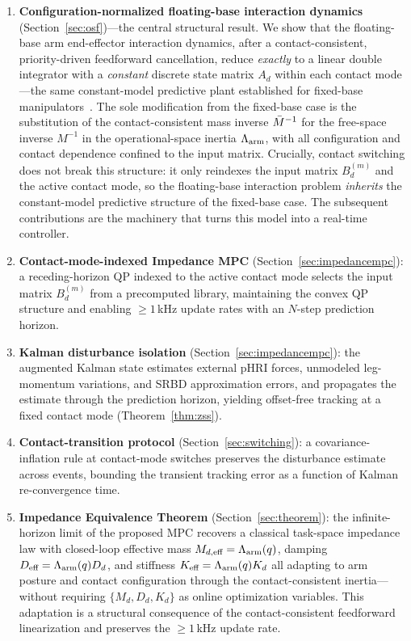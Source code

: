 \begin{enumerate}
\item \textbf{Configuration-normalized floating-base interaction dynamics}
(Section~\ref{sec:osf})---the central structural result. We show that the
floating-base arm end-effector interaction dynamics, after a
contact-consistent, priority-driven feedforward cancellation, reduce
\emph{exactly} to a linear double integrator with a \emph{constant} discrete
state matrix $A_d$ within each contact mode---the same constant-model
predictive plant established for fixed-base manipulators~\cite{cao2026impedance}.
The sole modification from the fixed-base case is the substitution of the
contact-consistent mass inverse $\bar{M}^{-1}$ for the free-space inverse $M^{-1}$
in the operational-space inertia $\Lambda_{\text{arm}}$, with all configuration and contact
dependence confined to the input matrix. Crucially, contact switching does
not break this structure: it only reindexes the input matrix $B_d^{(m)}$ and
the active contact mode, so the floating-base interaction problem
\emph{inherits} the constant-model predictive structure of the fixed-base
case. The subsequent contributions are the machinery that turns this model
into a real-time controller.

\item \textbf{Contact-mode-indexed Impedance MPC}
(Section~\ref{sec:impedancempc}): a receding-horizon QP indexed to the
active contact mode selects the input matrix $B_d^{(m)}$ from a
precomputed library, maintaining the convex QP structure and enabling
${\geq}1$\,kHz update rates with an $N$-step prediction horizon.

\item \textbf{Kalman disturbance isolation}
(Section~\ref{sec:impedancempc}): the augmented Kalman state estimates external
pHRI forces, unmodeled leg-momentum variations, and SRBD approximation errors,
and propagates the estimate through the prediction horizon, yielding
offset-free tracking at a fixed contact mode (Theorem~\ref{thm:zss}).

\item \textbf{Contact-transition protocol} (Section~\ref{sec:switching}):
a covariance-inflation rule at contact-mode switches preserves the
disturbance estimate across events, bounding the transient tracking error
as a function of Kalman re-convergence time.

\item \textbf{Impedance Equivalence Theorem} (Section~\ref{sec:theorem}):
the infinite-horizon limit of the proposed MPC recovers a classical
task-space impedance law with closed-loop effective mass
$M_{d,\text{eff}}=\Lambda_{\text{arm}}(q)$, damping $D_{\text{eff}}=\Lambda_{\text{arm}}(q)D_d$, and
stiffness $K_{\text{eff}}=\Lambda_{\text{arm}}(q)K_d$ all adapting to arm posture and
contact configuration through the contact-consistent inertia---without
requiring $\{M_d,D_d,K_d\}$ as online optimization variables. This
adaptation is a structural consequence of the contact-consistent feedforward
linearization and preserves the ${\geq}1$\,kHz update rate.


\end{enumerate}
